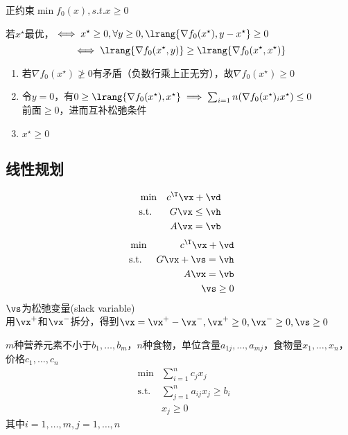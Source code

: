 \begin{example}
正约束$\min f_0(x),s.t. x\geq 0$
\end{example}
\begin{analysis}
若$x^\star$最优，$\iff x^\star\geq 0,\forall y\geq 0,\lrang{\nabla f_0(x^\star),y-x^\star}\geq 0$
\[\iff \lrang{\nabla f_0(x^\star,y)}\geq\lrang{\nabla f_0(x^\star,x^\star)}\]
\begin{enumerate}
\item 若$\nabla f_0(x^\star)\ngeq 0$有矛盾（负数行乘上正无穷），故$\nabla f_0(x^\star)\geq 0$
\item 令$y=0$，有$0\geq \lrang{\nabla f_0(x^\star),x^\star}\implies\sum_{i=1}n(\nabla f_0(x^\star)_ix^\star)\leq 0$\\
前面$\geq 0$，进而互补松弛条件
\item $x^\star\geq 0$
\end{enumerate}

\subsection{线性规划}
\[\begin{aligned}
&\min &c^\T\vx+\vd\\
&\text{s.t.} & G\vx\leq\vh\\
& & A\vx=\vb
\end{aligned}\]
\[\begin{aligned}
&\min &c^\T\vx+\vd\\
&\text{s.t.} & G\vx+\vs=\vh\\\
& & A\vx=\vb\\
& & \vs\geq 0
\end{aligned}\]
$\vs$为松弛变量(slack variable)\\
用$\vx^+$和$\vx^-$拆分，得到$\vx=\vx^+-\vx^-,\vx^+\geq 0,\vx^-\geq 0,\vs\geq 0$

\begin{example}[食谱问题]
$m$种营养元素不小于$b_1,\ldots,b_m$，$n$种食物，单位含量$a_{1j},\ldots,a_{mj}$，食物量$x_1,\ldots,x_n$，价格$c_1,\ldots,c_n$
\[\begin{aligned}
& \min & \sum_{i=1}^n c_jx_j\\
& \text{s.t.} & \sum_{j=1}^n a_{ij}x_j\geq b_i\\
& & x_j\geq 0
\end{aligned}\]
其中$i=1,\ldots,m,j=1,\ldots,n$
\end{example}

\end{analysis}